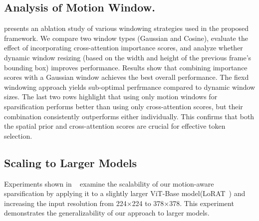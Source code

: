 
\subsection{Analysis of Motion Window.}
 presents an ablation study of various windowing strategies used in the proposed framework. We compare two window types (Gaussian and Cosine), evaluate the effect of incorporating cross-attention importance scores, and analyze whether dynamic window resizing (based on the width and height of the previous frame’s bounding box) improves performance. Results show that combining importance scores with a Gaussian window achieves the best overall performance. The fiexd windowing approach yields sub-optimal perfrmance compared to dynamic window sizes. The last two rows highlight that using only motion windows for sparsification performs better than using only cross-attention scores, but their combination consistently outperforms either individually. This confirms that both the spatial prior and cross-attention scores are crucial for effective token selection.




\subsection{Scaling to Larger Models}
Experiments shown in ~ examine the scalability of our motion-aware sparsification by applying it to a slightly larger ViT-Base model(LoRAT~\cite{lin2024loratrack}) and increasing the input resolution from 224×224 to 378×378. This experiment demonstrates the generalizability of our approach to larger models.




